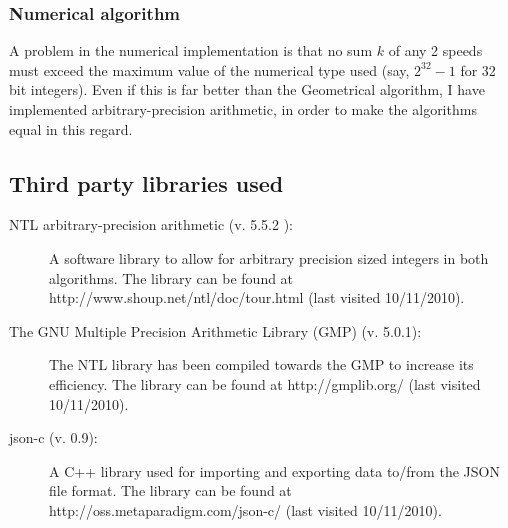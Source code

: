 \subsubsection{Numerical algorithm}
A problem in the numerical implementation is that no sum $k$ of any 2 speeds must exceed the maximum value of the numerical type used (say, $2^{32} - 1$ for 32 bit integers). Even if this is far better than the Geometrical algorithm, I have implemented arbitrary-precision arithmetic, in order to make the algorithms equal in this regard.



\subsection{Third party libraries used}
\label{third_party}
\begin{description}
\item[NTL arbitrary-precision arithmetic (v. 5.5.2 ):] A software library to allow for arbitrary precision sized integers in both algorithms. The library can be found at http://www.shoup.net/ntl/doc/tour.html (last visited 10/11/2010).
\item[The GNU Multiple Precision Arithmetic Library (GMP) (v. 5.0.1):] The NTL library has been compiled towards the GMP to increase its efficiency. The library can be found at http://gmplib.org/ (last visited 10/11/2010).  
\item[json-c (v. 0.9):] A C++ library used for importing and exporting data to/from the JSON file format. The library can be found at http://oss.metaparadigm.com/json-c/ (last visited 10/11/2010).
\end{description}
